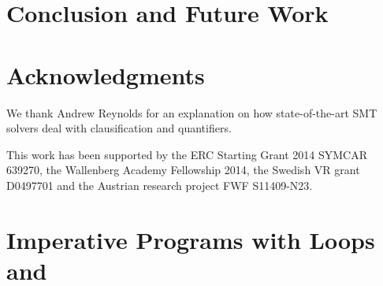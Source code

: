 \section{Conclusion and Future Work}
\label{sec:newcnf/conclusions}


\section*{Acknowledgments}
\label{sec:newcnf/acknowledgments}
We thank Andrew Reynolds for an explanation on how state-of-the-art SMT solvers deal with clausification and quantifiers. 

This work has been supported by the ERC Starting Grant 2014 SYMCAR 639270, the Wallenberg Academy Fellowship 2014, the Swedish VR grant D0497701 and the Austrian research project FWF S11409-N23.


\newpage
\section{Imperative Programs with Loops and \ITE}
\label{sec:newcnf/examples}

